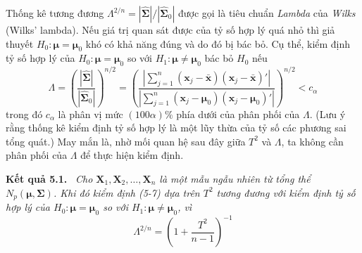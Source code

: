 Thống kê tương đương $\Lambda^{2/n}=|\hat{\boldsymbol{\Sigma}}|/|\hat{\boldsymbol{\Sigma}}_0|$ được gọi là tiêu chuẩn \emph{Lambda} của \emph{Wilks} (Wilks' lambda). Nếu giá trị quan sát được của tỷ số hợp lý quá nhỏ thì giả thuyết $H_0: \boldsymbol{\mu} = \boldsymbol{\mu}_0$ khó có khả năng đúng và do đó bị bác bỏ. Cụ thể, kiểm định tỷ số hợp lý của $H_0: \boldsymbol{\mu} = \boldsymbol{\mu}_0$ so với $H_1: \boldsymbol{\mu} \neq \boldsymbol{\mu}_0$ bác bỏ $H_0$ nếu
\begin{equation}
\Lambda = \left(\frac{|\hat{\boldsymbol{\Sigma}}|}{|\hat{\boldsymbol{\Sigma}}_0|}\right)^{n/2}
= \left(
\frac{\left|\sum\limits_{j=1}^{n}(\mathbf{x}_j-\bar{\mathbf{x}})(\mathbf{x}_j-\bar{\mathbf{x}})'\right|}
     {\left|\sum\limits_{j=1}^{n}(\mathbf{x}_j-\boldsymbol{\mu}_0)(\mathbf{x}_j-\boldsymbol{\mu}_0)'\right|}
\right)^{n/2} < c_\alpha
\tag{5-13}
\end{equation}
trong đó $c_\alpha$ là phân vị mức $(100\alpha)\%$ phía dưới của phân phối của $\Lambda$. (Lưu ý rằng thống kê kiểm định tỷ số hợp lý là một lũy thừa của tỷ số các phương sai tổng quát.) May mắn là, nhờ mối quan hệ sau đây giữa $T^2$ và $\Lambda$, ta không cần phân phối của $\Lambda$ để thực hiện kiểm định.

\par\medskip\noindent\textbf{Kết quả 5.1.}\ \itshape
Cho $\mathbf{X}_1,\mathbf{X}_2,\dots,\mathbf{X}_n$ là một mẫu ngẫu nhiên từ tổng thể $N_p(\boldsymbol{\mu},\boldsymbol{\Sigma})$. Khi đó kiểm định (5-7) dựa trên $T^2$ tương đương với kiểm định tỷ số hợp lý của $H_0: \boldsymbol{\mu} = \boldsymbol{\mu}_0$ so với $H_1: \boldsymbol{\mu} \neq \boldsymbol{\mu}_0$, vì
\[
\Lambda^{2/n} = \left(1+\frac{T^2}{n-1}\right)^{-1}
\]
\upshape\par\medskip

